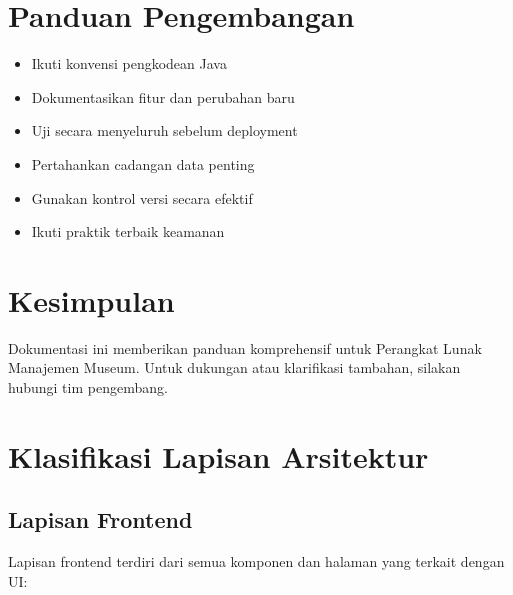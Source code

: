 \documentclass[12pt,a4paper]{article}
\begin{document}
\section{Panduan Pengembangan}
\begin{itemize}
    \item Ikuti konvensi pengkodean Java
    \item Dokumentasikan fitur dan perubahan baru
    \item Uji secara menyeluruh sebelum deployment
    \item Pertahankan cadangan data penting
    \item Gunakan kontrol versi secara efektif
    \item Ikuti praktik terbaik keamanan
\end{itemize}

\section{Kesimpulan}
Dokumentasi ini memberikan panduan komprehensif untuk Perangkat Lunak Manajemen Museum. Untuk dukungan atau klarifikasi tambahan, silakan hubungi tim pengembang.

\section{Klasifikasi Lapisan Arsitektur}

\subsection{Lapisan Frontend}
Lapisan frontend terdiri dari semua komponen dan halaman yang terkait dengan UI:
\end{document}
